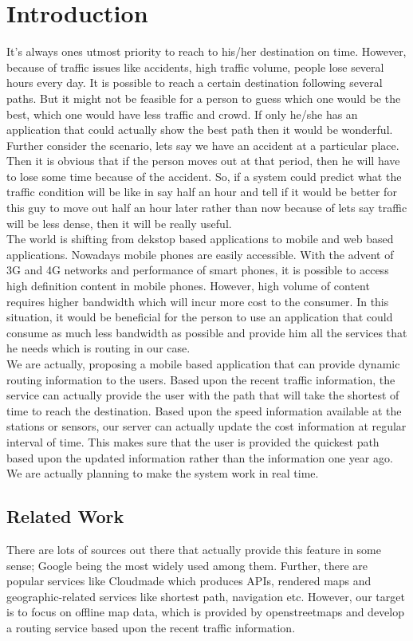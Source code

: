 \documentclass[a4paper,12pt, notitlepage, oneside, onecolumn]{article}
\begin{document}
\section{Introduction}
It's always ones utmost priority to reach to his/her destination on time. However, because of traffic issues like accidents, high traffic volume, people lose several hours every day. It is possible to reach a certain destination following several paths. But it might not be feasible for a person to guess which one would be the best, which one would have less traffic and crowd. If only he/she has an application that could actually show  the best path then it would be wonderful. Further consider the scenario, lets say we have an accident at a particular place. Then it is obvious that if the person moves out at that period, then he will have to lose some time because of the accident. So, if a system could predict what the traffic condition will be like in say half an hour and tell if it would be better for this guy to move out half an hour later rather than now because of lets say traffic will be less dense, then it will be really useful.\\

The world is shifting from dekstop based applications to mobile and web based applications. Nowadays mobile phones are easily accessible. With the advent of 3G and 4G networks and performance of smart phones, it is possible to access high definition content in mobile phones. However, high volume of content requires higher bandwidth which will incur more cost to the consumer. In this situation, it would be beneficial for the person to use an application that could consume as much less bandwidth as possible and provide him all the services that he needs which is routing in our case.\\

We are actually, proposing a mobile based application that can provide dynamic routing information to the users. Based upon the recent traffic information, the service can actually provide the user with the path that will take the shortest of time to reach the destination. Based upon the speed information available at the stations or sensors, our server can actually update the cost information at regular interval of time. This makes sure that the user is provided the quickest path based upon the updated information rather than the information one year ago. We are actually planning to make the system work in real time.

\subsection{Related Work}
There are lots of sources out there that actually provide this feature in some sense; Google being the most widely used among them. Further, there are  popular services like Cloudmade which produces  APIs, rendered maps and geographic-related services like shortest path, navigation etc. However, our target is to focus on offline map data, which is provided by openstreetmaps and develop a routing service based upon the recent traffic information.
\end{document}
